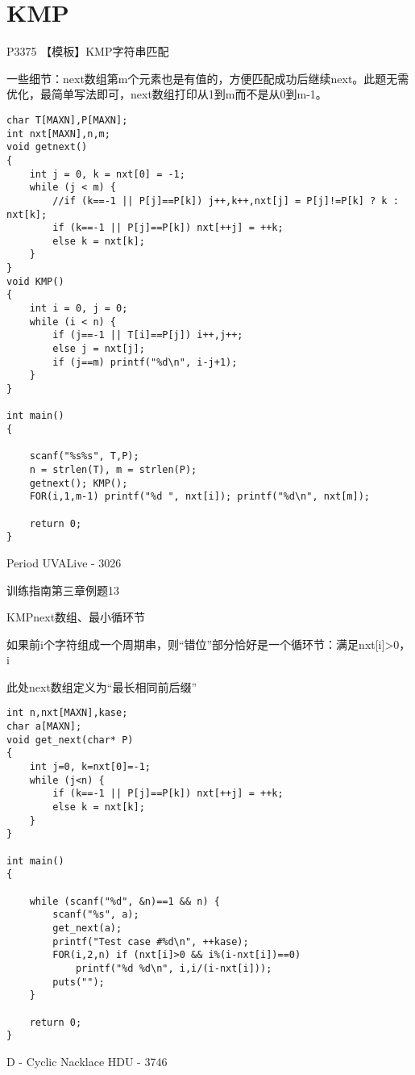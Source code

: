 \section{KMP}

P3375 【模板】KMP字符串匹配

一些细节：next数组第m个元素也是有值的，方便匹配成功后继续next。此题无需优化，最简单写法即可，next数组打印从1到m而不是从0到m-1。

\begin{lstlisting}
char T[MAXN],P[MAXN];
int nxt[MAXN],n,m;
void getnext()
{
    int j = 0, k = nxt[0] = -1;
    while (j < m) {
        //if (k==-1 || P[j]==P[k]) j++,k++,nxt[j] = P[j]!=P[k] ? k : nxt[k];
        if (k==-1 || P[j]==P[k]) nxt[++j] = ++k;
        else k = nxt[k];
    }
}
void KMP()
{
    int i = 0, j = 0;
    while (i < n) {
        if (j==-1 || T[i]==P[j]) i++,j++;
        else j = nxt[j];
        if (j==m) printf("%d\n", i-j+1);
    }
}

int main()
{

    scanf("%s%s", T,P);
    n = strlen(T), m = strlen(P);
    getnext(); KMP();
    FOR(i,1,m-1) printf("%d ", nxt[i]); printf("%d\n", nxt[m]);

    return 0;
}
\end{lstlisting}

Period UVALive - 3026

训练指南第三章例题13

KMPnext数组、最小循环节

如果前i个字符组成一个周期串，则“错位”部分恰好是一个循环节：满足nxt[i]>0，i%

此处next数组定义为“最长相同前后缀”

\begin{lstlisting}
int n,nxt[MAXN],kase;
char a[MAXN];
void get_next(char* P)
{
    int j=0, k=nxt[0]=-1;
    while (j<n) {
        if (k==-1 || P[j]==P[k]) nxt[++j] = ++k;
        else k = nxt[k];
    }
}

int main()
{

    while (scanf("%d", &n)==1 && n) {
        scanf("%s", a);
        get_next(a);
        printf("Test case #%d\n", ++kase);
        FOR(i,2,n) if (nxt[i]>0 && i%(i-nxt[i])==0)
            printf("%d %d\n", i,i/(i-nxt[i]));
        puts("");
    }

    return 0;
}
\end{lstlisting}

D - Cyclic Nacklace HDU - 3746

